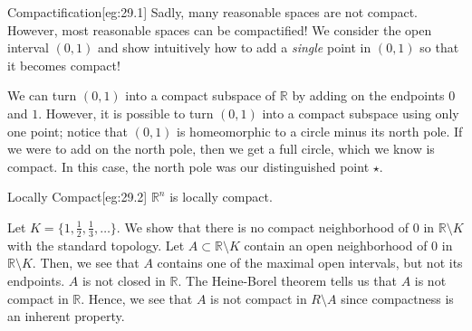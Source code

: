 \begin{egBox}{Compactification}[eg:29.1]
    Sadly, many reasonable spaces are not compact.
    However, most reasonable spaces can be compactified!
    We consider the open interval \( ( 0, 1 ) \) and show intuitively how to 
    add a \textit{single} point in \( ( 0, 1 ) \) so that it becomes compact!

    \baseSkip

    We can turn \( ( 0, 1 ) \) into a compact subspace of \( \mathbb{R} \) by
    adding on the endpoints \( 0 \) and \( 1 \).
    However, it is possible to turn \( ( 0, 1 ) \) into a compact subspace
    using only one point; notice that \( ( 0, 1 ) \) is homeomorphic to 
    a circle minus its north pole.
    If we were to add on the north pole, then we get a full circle, which we
    know is compact.
    In this case, the north pole was our distinguished point \( \star \).
\end{egBox}

\begin{egBox}{Locally Compact}[eg:29.2]
    \( \mathbb{R}^{ n } \) is locally compact.

    \baseRule

    Let \( K = \{ 1, \frac{ 1 }{ 2 }, \frac{ 1 }{ 3 } , \ldots \} \).
    We show that there is no compact neighborhood of \( 0 \) in 
    \( \mathbb{R} \setminus K \) with the standard topology.
    Let \( A \subset \mathbb{R} \setminus K \) contain an open neighborhood
    of \( 0 \) in \( \mathbb{R} \setminus K \).
    Then, we see that \( A \) contains one of the maximal open intervals,
    but not its endpoints.
    \( A \) is not closed in \( \mathbb{R} \).
    The Heine-Borel theorem tells us that \( A \) is not compact in 
    \( \mathbb{R} \).
    Hence, we see that \( A \) is not compact in \( R \setminus A \) since 
    compactness is an inherent property.
\end{egBox}


